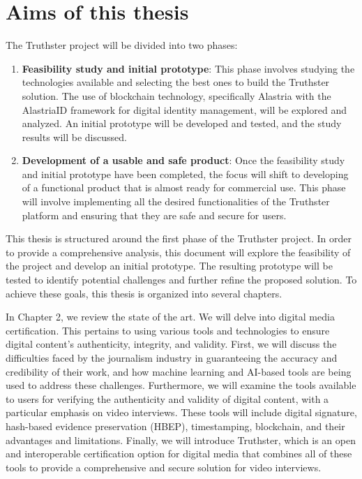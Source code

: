 \documentclass[target=mst,aauheader=]{thud}
\begin{document}
\section{Aims of this thesis}

The Truthster project will be divided into two phases:

\begin{enumerate}

    \item \textbf{Feasibility study and initial prototype}: This phase involves studying the technologies available and selecting the best ones to build the Truthster solution. The use of blockchain technology, specifically Alastria with the AlastriaID framework for digital identity management, will be explored and analyzed. An initial prototype will be developed and tested, and the study results will be discussed.
    \item \textbf{Development of a usable and safe product}: Once the feasibility study and initial prototype have been completed, the focus will shift to developing of a functional product that is almost ready for commercial use. This phase will involve implementing all the desired functionalities of the Truthster platform and ensuring that they are safe and secure for users.

\end{enumerate}

This thesis is structured around the first phase of the Truthster project. In order to provide a comprehensive analysis, this document will explore the feasibility of the project and develop an initial prototype. The resulting prototype will be tested to identify potential challenges and further refine the proposed solution.
To achieve these goals, this thesis is organized into several chapters.

    In Chapter 2, we review the state of the art. We will delve into digital media certification. This pertains to using various tools and technologies to ensure digital content's authenticity, integrity, and validity. First, we will discuss the difficulties faced by the journalism industry in guaranteeing the accuracy and credibility of their work, and how machine learning and AI-based tools are being used to address these challenges. Furthermore, we will examine the tools available to users for verifying the authenticity and validity of digital content, with a particular emphasis on video interviews. These tools will include digital signature, hash-based evidence preservation (HBEP), timestamping, blockchain, and their advantages and limitations. Finally, we will introduce Truthster, which is an open and interoperable certification option for digital media that combines all of these tools to provide a comprehensive and secure solution for video interviews.
    
\end{document}
